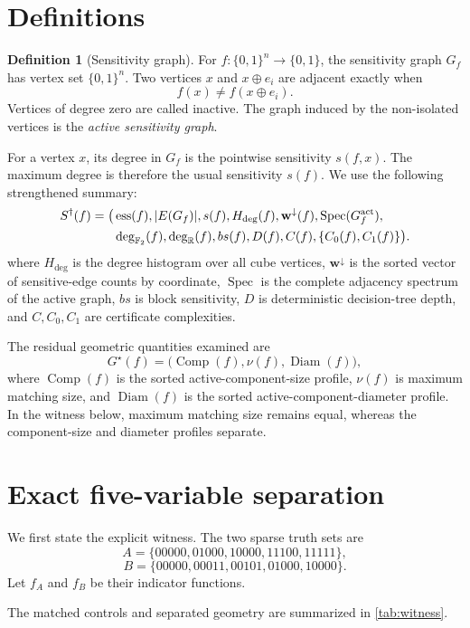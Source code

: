 \documentclass[twoside,12pt,letterpaper]{article}
\theoremstyle{definition}
\newtheorem{definition}{Definition}
\begin{document}
\section{Definitions}
\begin{definition}[Sensitivity graph]
For $f:\{0,1\}^n\to\{0,1\}$, the sensitivity graph $G_f$ has vertex set $\{0,1\}^n$. Two vertices $x$ and $x\oplus e_i$ are adjacent exactly when
\[
f(x)\neq f(x\oplus e_i).
\]
Vertices of degree zero are called inactive. The graph induced by the non-isolated vertices is the \emph{active sensitivity graph}.
\end{definition}

For a vertex $x$, its degree in $G_f$ is the pointwise sensitivity $s(f,x)$. The maximum degree is therefore the usual sensitivity $s(f)$. We use the following strengthened summary:
\begin{align*}
S^\dagger(f)=\bigl(&\operatorname{ess}(f), |E(G_f)|, s(f), H_{\deg}(f),
\mathbf w^\downarrow(f), \operatorname{Spec}(G_f^{\rm act}),\\
&\deg_{\mathbb F_2}(f),\deg_{\mathbb R}(f),bs(f),D(f),C(f),
\{C_0(f),C_1(f)\}\bigr).
\end{align*}
where $H_{\deg}$ is the degree histogram over all cube vertices, $\mathbf w^\downarrow$ is the sorted vector of sensitive-edge counts by coordinate, $\operatorname{Spec}$ is the complete adjacency spectrum of the active graph, $bs$ is block sensitivity, $D$ is deterministic decision-tree depth, and $C,C_0,C_1$ are certificate complexities.

The residual geometric quantities examined are
\[
G^\star(f)=\bigl(\operatorname{Comp}(f),\nu(f),\operatorname{Diam}(f)\bigr),
\]
where $\operatorname{Comp}(f)$ is the sorted active-component-size profile, $\nu(f)$ is maximum matching size, and $\operatorname{Diam}(f)$ is the sorted active-component-diameter profile. In the witness below, maximum matching size remains equal, whereas the component-size and diameter profiles separate.

\section{Exact five-variable separation}
We first state the explicit witness. The two sparse truth sets are
\[
A=\{00000,01000,10000,11100,11111\},
\]
\[
B=\{00000,00011,00101,01000,10000\}.
\]
Let $f_A$ and $f_B$ be their indicator functions.

The matched controls and separated geometry are summarized in \cref{tab:witness}.
\end{document}
